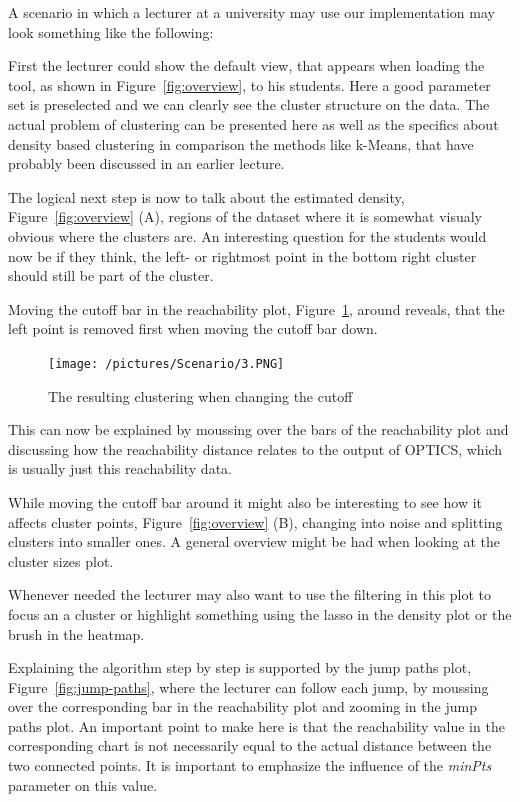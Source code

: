\documentclass{vgtc} %
\begin{document}
A scenario in which a lecturer at a university may use our implementation may look something like the following:

First the lecturer could show the default view, that appears when loading the tool, as shown in Figure~\ref{fig:overview}, to his students. Here a good parameter set is preselected and we can clearly see the cluster structure on the data. The actual problem of clustering can be presented here as well as the specifics about density based clustering in comparison the methods like k-Means, that have probably been discussed in an earlier lecture.

The logical next step is now to talk about the estimated density, Figure~\ref{fig:overview} (A), regions of the dataset where it is somewhat visualy obvious where the clusters are. An interesting question for the students would now be if they think, the left- or rightmost point in the bottom right cluster should still be part of the cluster.

Moving the cutoff bar in the reachability plot, Figure~\ref{fig:reachability-plot}, around reveals, that the left point is removed first when moving the cutoff bar down.

\begin{figure}[tb]
    \centering
    \texttt{[image: /pictures/Scenario/3.PNG]}
    \caption{The resulting clustering when changing the cutoff}
    \label{fig:reachability-plot}
\end{figure}

This can now be explained by moussing over the bars of the reachability plot and discussing how the reachability distance relates to the output of OPTICS, which is usually just this reachability data.

While moving the cutoff bar around it might also be interesting to see how it affects cluster points, Figure~\ref{fig:overview} (B), changing into noise and splitting clusters into smaller ones. A general overview might be had when looking at the cluster sizes plot.

Whenever needed the lecturer may also want to use the filtering in this plot to focus an a cluster or highlight something using the lasso in the density plot or the brush in the heatmap.

Explaining the algorithm step by step is supported by the jump paths plot, Figure~\ref{fig:jump-paths}, where the lecturer can follow each jump, by moussing over the corresponding bar in the reachability plot and zooming in the jump paths plot. An important point to make here is that the reachability value in the corresponding chart is not necessarily equal to the actual distance between the two connected points. It is important to emphasize the influence of the \emph{minPts} parameter on this value.
\end{document}
